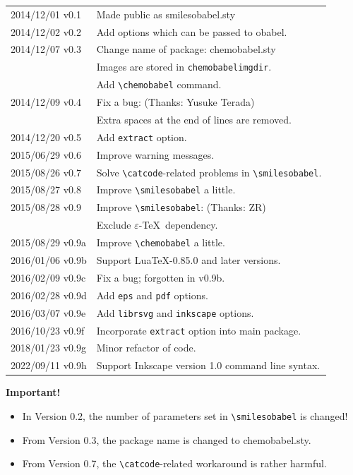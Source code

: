 \documentclass[12pt]{ltjsarticle}
\begin{document}
\begin{table}[h]
\centering
\begin{tabular}{ll}
2014/12/01 v0.1  & Made public as \textsf{smilesobabel.sty} \\
2014/12/02 v0.2  & Add options which can be passed to obabel. \\
2014/12/07 v0.3  & Change name of package: \textsf{chemobabel.sty} \\
                 & Images are stored in \texttt{chemobabelimgdir}. \\
                 & Add \verb|\chemobabel| command. \\
2014/12/09 v0.4  & Fix a bug: (Thanks: Yusuke Terada) \\
                 & Extra spaces at the end of lines are removed. \\
2014/12/20 v0.5  & Add \verb|extract| option. \\
2015/06/29 v0.6  & Improve warning messages. \\
2015/08/26 v0.7  & Solve \verb|\catcode|-related problems in \verb|\smilesobabel|. \\
2015/08/27 v0.8  & Improve \verb|\smilesobabel| a little. \\
2015/08/28 v0.9  & Improve \verb|\smilesobabel|: (Thanks: ZR) \\
                 & Exclude $\varepsilon$-\TeX\ dependency. \\
2015/08/29 v0.9a & Improve \verb|\chemobabel| a little. \\
2016/01/06 v0.9b & Support Lua\TeX-0.85.0 and later versions. \\
2016/02/09 v0.9c & Fix a bug; forgotten in v0.9b. \\
2016/02/28 v0.9d & Add \verb|eps| and \verb|pdf| options. \\
2016/03/07 v0.9e & Add \verb|librsvg| and \verb|inkscape| options. \\
2016/10/23 v0.9f & Incorporate \verb|extract| option into main package. \\
2018/01/23 v0.9g & Minor refactor of code. \\
2022/09/11 v0.9h & Support Inkscape version 1.0 command line syntax. \\
\end{tabular}
\end{table}

\textbf{Important!}
\begin{itemize}
\item In Version 0.2, the number of parameters set in \verb|\smilesobabel| is changed!
\item From Version 0.3, the package name is changed to \textsf{chemobabel.sty}.
\item From Version 0.7, the \verb|\catcode|-related workaround is rather harmful.
\end{itemize}
\end{document}
